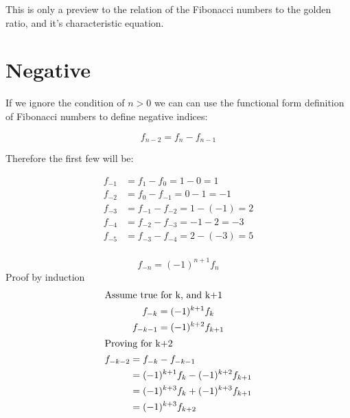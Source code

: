\documentclass[a4paper]{article}
\begin{document}
This is only a preview to the relation of the Fibonacci numbers to the golden ratio, and it's characteristic equation.

\section{Negative}
If we ignore the condition of $n>0$ we can can use the functional form definition of Fibonacci numbers to define negative indices: 

\begin{equation}
f_{n-2} = f_n - f_{n-1}
\end{equation}

%

Therefore the first few will be:

\begin{align*}
f_{-1} &= f_{1} - f_{0} = 1 - 0 = 1\\
f_{-2} &= f_{0} - f_{-1} = 0 - 1 = -1\\
f_{-3} &= f_{-1} - f_{-2} = 1 - (-1) = 2\\
f_{-4} &= f_{-2} - f_{-3} = -1 - 2 = -3\\
f_{-5} &= f_{-3} - f_{-4} = 2 - (-3)= 5\\
\end{align*}

\begin{theorem}
$$
f_{-n} = (-1)^{n+1} f_{n}
$$
Proof by induction
\begin{gather*}
\shortintertext{Assume true for k, and k+1}
f_{-k} = (-1)^{k+1} f_{k}\\
f_{-k-1} = (-1)^{k+2} f_{k+1}\\
\shortintertext{Proving for k+2}
\begin{split}
f_{-k-2} &= f_{-k} - f_{-k-1} \\
		&= (-1)^{k+1} f_{k} - (-1)^{k+2} f_{k+1}\\
		 &= (-1)^{k+3} f_{k} + (-1)^{k+3} f_{k+1} \\
		 &= (-1)^{k+3} f_{k+2}
\\
\end{split}
\end{gather*}
\end{theorem}
\end{document}
